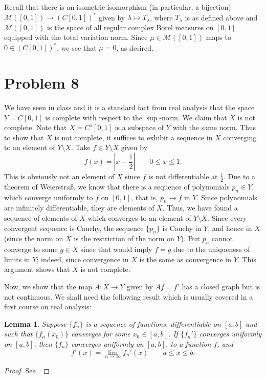 \documentclass[10pt]{amsart}
\theoremstyle{thmstyle}
\newtheorem{lemma}[theorem]{Lemma}
\theoremstyle{defstyle}
\renewcommand{\le}{\leqslant}
\begin{document}
Recall that there is an isometric isomorphism (in particular, a bijection) $\mathscr M([0, 1])\to \left(C[0, 1]\right)^\ast$ given by $\lambda\mapsto T_\lambda$, where $T_\lambda$ is as defined above and $\mathscr M([0, 1])$ is the space of all regular complex Borel measures on $[0, 1]$ equipped with the total variation norm. Since $\mu\in\mathscr M([0, 1])$ maps to $0\in\left(C[0, 1]\right)^\ast$, we see that $\mu = 0$, as desired.

\section{Problem 8}

We have seen in class and it is a standard fact from real analysis that the space $Y = C[0, 1]$ is complete with respect to the $\sup$-norm. We claim that $X$ is not complete. Note that $X = C^1[0, 1]$ is a subspace of $Y$ with the same norm. Thus to show that $X$ is not complete, it suffices to exhibit a sequence in $X$ converging to an element of $Y\setminus X$. Take $f\in Y\setminus X$ given by 
\begin{equation*}
	f(x) = \left|x - \frac{1}{2}\right| \qquad 0\le x\le 1.
\end{equation*}
This is obviously not an element of $X$ since $f$ is not differentiable at $\frac{1}{2}$. Due to a theorem of Weierstra\ss, we know that there is a sequence of polynomials $p_n\in Y$, which converge uniformly to $f$ on $[0, 1]$, that is, $p_n\to f$ in $Y$. Since polynomials are infinitely differentiable, they are elements of $X$. Thus, we have found a sequence of elements of $X$ which converges to an element of $Y\setminus X$. Since every convergent sequence is Cauchy, the sequence $\{p_n\}$ is Cauchy in $Y$, and hence in $X$ (since the norm on $X$ is the restriction of the norm on $Y$). But $p_n$ cannot converge to some $g\in X$ since that would imply $f = g$ due to the uniqueness of limits in $Y$; indeed, since convergence in $X$ is the same as convergence in $Y$. This argument shows that $X$ is not complete.

Now, we show that the map $A : X\to Y$ given by $Af = f'$ has a closed graph but is not continuous. We shall need the following result which is usually covered in a first course on real analysis:
\begin{lemma}
	Suppose $\{f_n\}$ is a sequence of functions, differentiable on $[a, b]$ and such that $\{f_n(x_0)\}$ converges for some $x_0\in [a, b]$. If $\{f_n'\}$ converges uniformly on $[a, b]$, then $\{f_n\}$ converges uniformly on $[a, b]$, to a function $f$, and 
	\begin{equation*}
		f'(x) = \lim_{n\to\infty} f_n'(x)\qquad a\le x\le b.
	\end{equation*}
\end{lemma}
\begin{proof}
	See \cite[Theorem 7.17]{baby-rudin}.
\end{proof}
\end{document}
